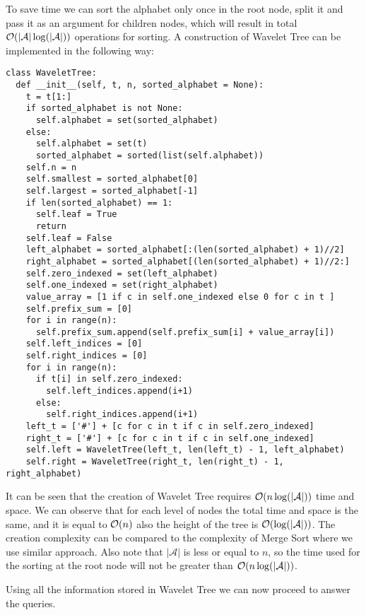 To save time we can sort the alphabet only once in the root node, split it and pass it as an argument for children nodes, which will result in total $\mathcal{O}(|\mathcal{A}|\log (|\mathcal{A}|))$ operations for sorting.
\newline
\newline
A construction of Wavelet Tree can be implemented in the following way:

\begin{verbatim}
class WaveletTree:
  def __init__(self, t, n, sorted_alphabet = None):
    t = t[1:]
    if sorted_alphabet is not None:
      self.alphabet = set(sorted_alphabet)
    else:
      self.alphabet = set(t)
      sorted_alphabet = sorted(list(self.alphabet))
    self.n = n
    self.smallest = sorted_alphabet[0]
    self.largest = sorted_alphabet[-1]
    if len(sorted_alphabet) == 1:
      self.leaf = True
      return
    self.leaf = False
    left_alphabet = sorted_alphabet[:(len(sorted_alphabet) + 1)//2]
    right_alphabet = sorted_alphabet[(len(sorted_alphabet) + 1)//2:]
    self.zero_indexed = set(left_alphabet)
    self.one_indexed = set(right_alphabet)
    value_array = [1 if c in self.one_indexed else 0 for c in t ]
    self.prefix_sum = [0]
    for i in range(n):
      self.prefix_sum.append(self.prefix_sum[i] + value_array[i])
    self.left_indices = [0]
    self.right_indices = [0]
    for i in range(n):
      if t[i] in self.zero_indexed:
        self.left_indices.append(i+1)
      else:
        self.right_indices.append(i+1)
    left_t = ['#'] + [c for c in t if c in self.zero_indexed]
    right_t = ['#'] + [c for c in t if c in self.one_indexed]
    self.left = WaveletTree(left_t, len(left_t) - 1, left_alphabet)
    self.right = WaveletTree(right_t, len(right_t) - 1, right_alphabet)
\end{verbatim}

It can be seen that the creation of Wavelet Tree requires $\mathcal{O}(n \log(|\mathcal{A}|))$ time and space. We can observe that for each level of nodes the total time and space is the same, and it is equal to $\mathcal{O}(n)$ also the height of the tree is $\mathcal{O}(\log(|\mathcal{A}|))$. The creation complexity can be compared to the complexity of Merge Sort \cite[p. 34-44]{cormenSufixArray} where we use similar approach. Also note that $|\mathcal{A}|$ is less or equal to $n$, so the time used for the sorting at the root node will not be greater than $\mathcal{O}(n \log(|\mathcal{A}|))$.
\newline

Using all the information stored in Wavelet Tree we can now proceed to answer the queries.
\newline


